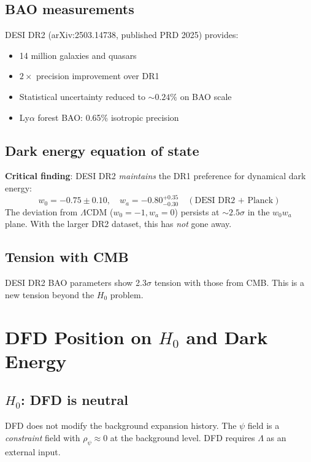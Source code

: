 \documentclass[11pt,a4paper]{article}
\begin{document}
\subsection{BAO measurements}

DESI DR2 (arXiv:2503.14738, published PRD 2025) provides:
\begin{itemize}
\item 14 million galaxies and quasars
\item $2\times$ precision improvement over DR1
\item Statistical uncertainty reduced to $\sim 0.24\%$ on BAO scale
\item Ly$\alpha$ forest BAO: 0.65\% isotropic precision
\end{itemize}

\subsection{Dark energy equation of state}

\textbf{Critical finding}: DESI DR2 \emph{maintains} the DR1 preference for dynamical dark energy:
\begin{equation}
w_0 = -0.75 \pm 0.10, \quad w_a = -0.80^{+0.35}_{-0.30} \quad (\text{DESI DR2 + Planck})
\end{equation}
The deviation from $\Lambda$CDM ($w_0 = -1, w_a = 0$) persists at $\sim 2.5\sigma$ in the $w_0 w_a$ plane. With the larger DR2 dataset, this has \emph{not} gone away.

\subsection{Tension with CMB}

DESI DR2 BAO parameters show 2.3$\sigma$ tension with those from CMB. This is a new tension beyond the $H_0$ problem.

\section{DFD Position on $H_0$ and Dark Energy}

\subsection{$H_0$: DFD is neutral}

DFD does not modify the background expansion history. The $\psi$ field is a \emph{constraint} field with $\rho_\psi \approx 0$ at the background level. DFD requires $\Lambda$ as an external input.
\end{document}
